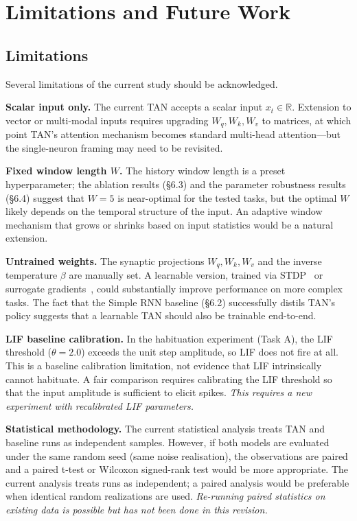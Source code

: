 \section{Limitations and Future Work}\label{sec:limitation}

\subsection{Limitations}

Several limitations of the current study should be acknowledged.

\textbf{Scalar input only.} The current TAN accepts a scalar input $x_t \in \mathbb{R}$. Extension to vector or multi-modal inputs requires upgrading $W_q, W_k, W_v$ to matrices, at which point TAN's attention mechanism becomes standard multi-head attention---but the single-neuron framing may need to be revisited.

\textbf{Fixed window length $W$.} The history window length is a preset hyperparameter; the ablation results (\S6.3) and the parameter robustness results (\S6.4) suggest that $W = 5$ is near-optimal for the tested tasks, but the optimal $W$ likely depends on the temporal structure of the input. An adaptive window mechanism that grows or shrinks based on input statistics would be a natural extension.

\textbf{Untrained weights.} The synaptic projections $W_q, W_k, W_v$ and the inverse temperature $\beta$ are manually set. A learnable version, trained via STDP~\cite{bi1998} or surrogate gradients~\cite{eshraghian2021,neftci2019}, could substantially improve performance on more complex tasks. The fact that the Simple RNN baseline (\S6.2) successfully distils TAN's policy suggests that a learnable TAN should also be trainable end-to-end.

\textbf{LIF baseline calibration.} In the habituation experiment (Task A), the LIF threshold ($\theta = 2.0$) exceeds the unit step amplitude, so LIF does not fire at all. This is a baseline calibration limitation, not evidence that LIF intrinsically cannot habituate. A fair comparison requires calibrating the LIF threshold so that the input amplitude is sufficient to elicit spikes. \textit{This requires a new experiment with recalibrated LIF parameters.}

\textbf{Statistical methodology.} The current statistical analysis treats TAN and baseline runs as independent samples. However, if both models are evaluated under the same random seed (same noise realisation), the observations are paired and a paired t-test or Wilcoxon signed-rank test would be more appropriate. The current analysis treats runs as independent; a paired analysis would be preferable when identical random realizations are used. \textit{Re-running paired statistics on existing data is possible but has not been done in this revision.}

